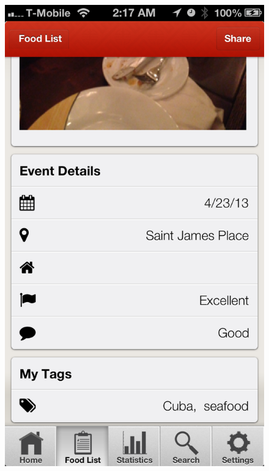 \begin{figure}
{	\includegraphics[width=\figwidth, totalheight=\figheight, keepaspectratio]{./screenshots/foodlist-detailcontd.png}} \hfill
	\subfigure[Twitter]{
	\label{fig:foodlist-twitter}
}
\end{figure}
